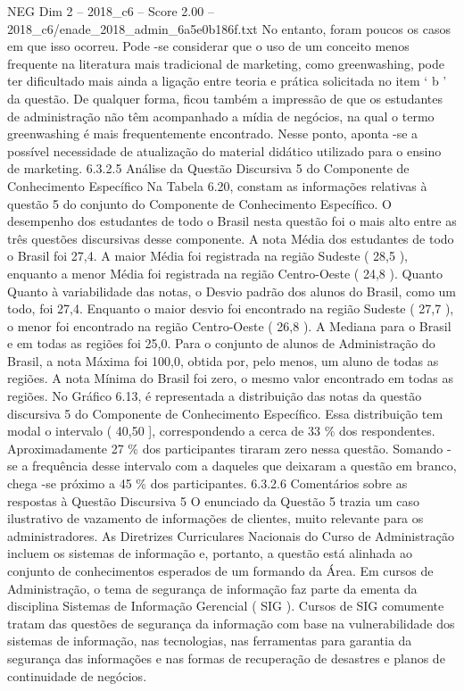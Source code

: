 \begin{textsample}{NEG Dim 2 – 2018\_c6 – Score 2.00 – 2018\_c6/enade\_2018\_admin\_6a5e0b186f.txt}
No entanto, foram poucos os casos em que isso ocorreu.
Pode -se considerar que o uso de um conceito menos frequente na literatura mais tradicional de marketing, como greenwashing, pode ter dificultado mais ainda a ligação entre teoria e prática solicitada no item ‘ b ’ da questão.
De qualquer forma, ficou também a impressão de que os estudantes de administração não têm acompanhado a mídia de negócios, na qual o termo greenwashing é mais frequentemente encontrado.
Nesse ponto, aponta -se a possível necessidade de atualização do material didático utilizado para o ensino de marketing. 6.3.2.5 Análise da Questão Discursiva 5 do Componente de Conhecimento Específico Na Tabela 6.20, constam as informações relativas à questão 5 do conjunto do Componente de Conhecimento Específico.
O desempenho dos estudantes de todo o Brasil nesta questão foi o mais alto entre as três questões discursivas desse componente.
A nota Média dos estudantes de todo o Brasil foi 27,4.
A maior Média foi registrada na região Sudeste ( 28,5 ), enquanto a menor Média foi registrada na região Centro-Oeste ( 24,8 ).
Quanto Quanto à variabilidade das notas, o Desvio padrão dos alunos do Brasil, como um todo, foi 27,4.
Enquanto o maior desvio foi encontrado na região Sudeste ( 27,7 ), o menor foi encontrado na região Centro-Oeste ( 26,8 ).
A Mediana para o Brasil e em todas as regiões foi 25,0.
Para o conjunto de alunos de Administração do Brasil, a nota Máxima foi 100,0, obtida por, pelo menos, um aluno de todas as regiões.
A nota Mínima do Brasil foi zero, o mesmo valor encontrado em todas as regiões.
No Gráfico 6.13, é representada a distribuição das notas da questão discursiva 5 do Componente de Conhecimento Específico.
Essa distribuição tem modal o intervalo ( 40,50 ], correspondendo a cerca de 33 \% dos respondentes.
Aproximadamente 27 \% dos participantes tiraram zero nessa questão.
Somando -se a frequência desse intervalo com a daqueles que deixaram a questão em branco, chega -se próximo a 45 \% dos participantes. 6.3.2.6 Comentários sobre as respostas à Questão Discursiva 5 O enunciado da Questão 5 trazia um caso ilustrativo de vazamento de informações de clientes, muito relevante para os administradores.
As Diretrizes Curriculares Nacionais do Curso de Administração incluem os sistemas de informação e, portanto, a questão está alinhada ao conjunto de conhecimentos esperados de um formando da Área.
Em cursos de Administração, o tema de segurança de informação faz parte da ementa da disciplina Sistemas de Informação Gerencial ( SIG ).
Cursos de SIG comumente tratam das questões de segurança da informação com base na vulnerabilidade dos sistemas de informação, nas tecnologias, nas ferramentas para garantia da segurança das informações e nas formas de recuperação de desastres e planos de continuidade de negócios.

\end{textsample}
